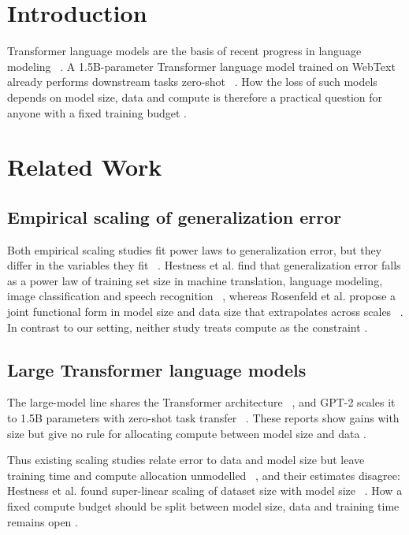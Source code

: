 \section{Introduction}

Transformer language models are the basis of recent progress in language modeling ~\cite{vaswani2017}. A 1.5B-parameter Transformer language model trained on WebText already performs downstream tasks zero-shot ~\cite{radford2019}. How the loss of such models depends on model size, data and compute is therefore a practical question for anyone with a fixed training budget .

\section{Related Work}

\subsection{Empirical scaling of generalization error}

Both empirical scaling studies fit power laws to generalization error, but they differ in the variables they fit ~\cite{hestness2017,rosenfeld2019}. Hestness et al. find that generalization error falls as a power law of training set size in machine translation, language modeling, image classification and speech recognition ~\cite{hestness2017}, whereas Rosenfeld et al. propose a joint functional form in model size and data size that extrapolates across scales ~\cite{rosenfeld2019}. In contrast to our setting, neither study treats compute as the constraint .

\subsection{Large Transformer language models}

The large-model line shares the Transformer architecture ~\cite{vaswani2017}, and GPT-2 scales it to 1.5B parameters with zero-shot task transfer ~\cite{radford2019}. These reports show gains with size but give no rule for allocating compute between model size and data .

Thus existing scaling studies relate error to data and model size but leave training time and compute allocation unmodelled ~\cite{rosenfeld2019}, and their estimates disagree: Hestness et al. found super-linear scaling of dataset size with model size ~\cite{hestness2017}. How a fixed compute budget should be split between model size, data and training time remains open .

